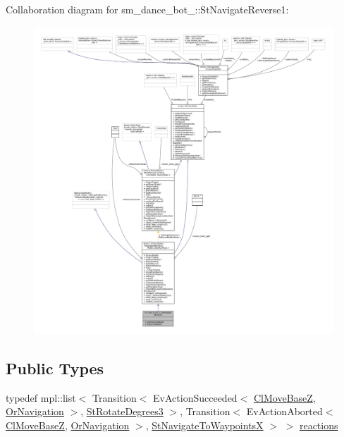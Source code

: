 Collaboration diagram for sm\+\_\+dance\+\_\+bot\+\_\+:\+:St\+Navigate\+Reverse1\+:
\nopagebreak
\begin{figure}[H]
\begin{center}
\leavevmode
\includegraphics[width=350pt]{structsm__dance__bot__3_1_1StNavigateReverse1__coll__graph}
\end{center}
\end{figure}
\subsection*{Public Types}
\begin{DoxyCompactItemize}
\item 
typedef mpl\+::list$<$ Transition$<$ Ev\+Action\+Succeeded$<$ \hyperlink{classmove__base__z__client_1_1ClMoveBaseZ}{Cl\+Move\+BaseZ}, \hyperlink{classsm__dance__bot__3_1_1OrNavigation}{Or\+Navigation} $>$, \hyperlink{structsm__dance__bot__3_1_1StRotateDegrees3}{St\+Rotate\+Degrees3} $>$, Transition$<$ Ev\+Action\+Aborted$<$ \hyperlink{classmove__base__z__client_1_1ClMoveBaseZ}{Cl\+Move\+BaseZ}, \hyperlink{classsm__dance__bot__3_1_1OrNavigation}{Or\+Navigation} $>$, \hyperlink{structsm__dance__bot__3_1_1StNavigateToWaypointsX}{St\+Navigate\+To\+WaypointsX} $>$ $>$ \hyperlink{structsm__dance__bot__3_1_1StNavigateReverse1_a17b7a59bdbfad23cdc323c09edd5a21c}{reactions}
\end{DoxyCompactItemize}
